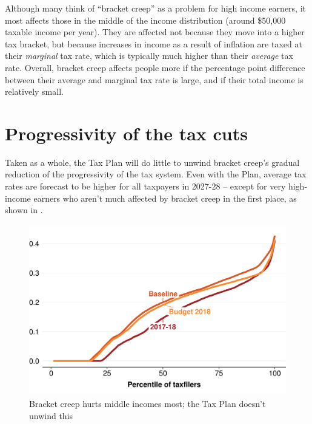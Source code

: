 \documentclass[submission]{grattan}\usepackage[]{graphicx}\usepackage[]{color}
\newenvironment{knitrout}{}{} %
\begin{document}
Although many think of ``bracket creep'' as a problem for high income earners, it most affects those in the middle of the income distribution (around \$50,000 taxable income per year). They are affected not because they move into a higher tax bracket, but because increases in income as a result of inflation are taxed at their \emph{marginal} tax rate, which is typically much higher than their \emph{average} tax rate. Overall, bracket creep affects people more if the percentage point difference between their average and marginal tax rate is large, and if their total income is relatively small.


\section{Progressivity of the tax cuts}\label{sec:progressivity-of-the-tax-cuts}

Taken as a whole, the Tax Plan will do little to unwind bracket creep's gradual reduction of the progressivity of the tax system. Even with the Plan, average tax rates are forecast to be higher for all taxpayers in 2027-28 -- except for very high-income earners who aren't much affected by bracket creep in the first place, as shown in .

\begin{figure}
\caption{Bracket creep hurts middle incomes most; the Tax Plan doesn't unwind this}\label{fig:bracket-creep-hurts-middle-incomes-most}
\begin{knitrout}
\color{fgcolor}
\includegraphics[width=4.47222in,height=2.92631723826715in]{atlas/fig2-1} 

\end{knitrout}


\end{figure}
\end{document}

